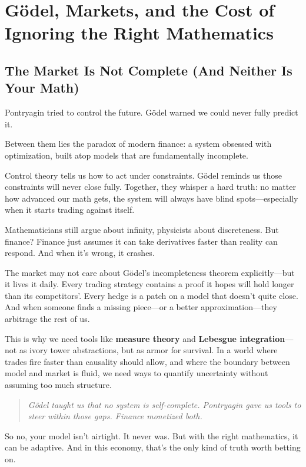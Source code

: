 \section{Gödel, Markets, and the Cost of Ignoring the Right Mathematics}

\subsection{The Market Is Not Complete (And Neither Is Your Math)}

Pontryagin tried to control the future. Gödel warned we could never fully predict it.

Between them lies the paradox of modern finance: a system obsessed with optimization, built atop models that are fundamentally incomplete.

Control theory tells us how to act under constraints. Gödel reminds us those constraints will never close fully. Together, they whisper a hard truth: no matter how advanced our math gets, the system will always have blind spots—especially when it starts trading against itself.

\medskip
\noindent
Mathematicians still argue about infinity, physicists about discreteness. But finance? Finance just assumes it can take derivatives faster than reality can respond. And when it’s wrong, it crashes.

\medskip
\noindent
The market may not care about Gödel’s incompleteness theorem explicitly—but it lives it daily. Every trading strategy contains a proof it hopes will hold longer than its competitors'. Every hedge is a patch on a model that doesn’t quite close. And when someone finds a missing piece—or a better approximation—they arbitrage the rest of us.

\medskip
\noindent
This is why we need tools like \textbf{measure theory} and \textbf{Lebesgue integration}—not as ivory tower abstractions, but as armor for survival. In a world where trades fire faster than causality should allow, and where the boundary between model and market is fluid, we need ways to quantify uncertainty without assuming too much structure.

\begin{quote}
\emph{Gödel taught us that no system is self-complete. Pontryagin gave us tools to steer within those gaps. Finance monetized both.}
\end{quote}

So no, your model isn’t airtight. It never was. But with the right mathematics, it can be adaptive. And in this economy, that's the only kind of truth worth betting on.

